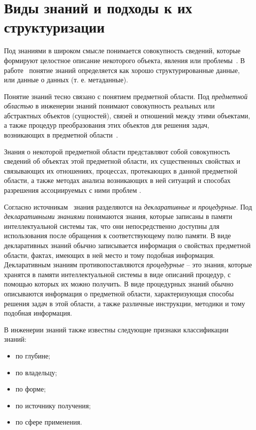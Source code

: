 \section{Виды знаний и подходы к их структуризации}

Под знаниями в широком смысле понимается совокупность сведений, которые формируют целостное описание некоторого объекта, явления или проблемы~\cite{Averkin1992}. В работе~\cite{Gavrilova2001} понятие знаний определяется как хорошо структурированные данные, или данные о данных (т. е. метаданные). 

Понятие знаний тесно связано с понятием предметной области. Под \textit{предметной областью} в инженерии знаний понимают совокупность реальных или абстрактных объектов (сущностей), связей и отношений между этими объектами, а также процедур преобразования этих объектов для решения задач, возникающих в предметной области~\cite{Averkin1992}.

Знания о некоторой предметной области представляют собой совокупность сведений об объектах этой предметной области, их существенных свойствах и связывающих их отношениях, процессах, протекающих в данной предметной области, а также методах анализа возникающих в ней ситуаций и способах разрешения ассоциируемых с ними проблем \cite{Gavrilova2001}.

Согласно источникам~\cite{Averkin1992, Jong1996} знания разделяются на \textit{декларативные} и \textit{процедурные}. Под \textit{декларативными знаниями} понимаются знания, которые записаны в памяти интеллектуальной системы так, что они непосредственно доступны для использования после обращения к соответствующему полю памяти. В виде декларативных знаний обычно записывается информация о свойствах предметной области, фактах, имеющих в ней место и тому подобная информация. Декларативным знаниям противопоставляются \textit{процедурные} – это знания, которые хранятся в памяти интеллектуальной системы в виде описаний процедур, с помощью которых их можно получить. В виде процедурных знаний обычно описываются информация о предметной области, характеризующая способы решения задач в этой области, а также различные инструкции, методики и тому подобная информация.

В инженерии знаний также известны следующие признаки классификации знаний:
\begin{itemize}
  \item по глубине;
  \item по владельцу;
  \item по форме;
  \item по источнику получения;
  \item по сфере применения.
\end{itemize}

